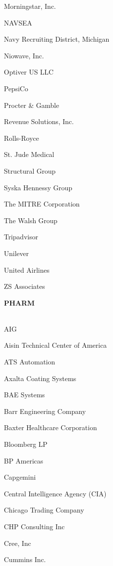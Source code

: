 \documentclass[twoside]{article}
\begin{document}
\begin{center}
\begin{multicols}{5}
\begin{FlushLeft}
\begin{compactitem}
\item Morningstar, Inc.
\item NAVSEA
\item Navy Recruiting District, Michigan
\item Niowave, Inc.
\item Optiver US LLC
\item PepsiCo
\item Procter \& Gamble
\item Revenue Solutions, Inc.
\item Rolls-Royce
\item St. Jude Medical
\item Structural Group
\item Syska Hennessy Group
\item The MITRE Corporation
\item The Walsh Group
\item Tripadvisor
\item Unilever
\item United Airlines
\item ZS Associates
\end{compactitem}
        \end{FlushLeft}
        \vspace{1em}
        {\fontsize{14}{16}\selectfont \bf PHARM}\\
        \vspace{-1em}
        ~\hrulefill~
        \vspace{-.9em}
        \begin{FlushLeft}
        \begin{compactitem}
        \item AIG
\item Aisin Technical Center of America
\item ATS Automation
\item Axalta Coating Systems
\item BAE Systems
\item Barr Engineering Company
\item Baxter Healthcare Corporation
\item Bloomberg LP
\item BP Americas
\item Capgemini
\item Central Intelligence Agency (CIA)
\item Chicago Trading Company
\item CHP Consulting Inc
\item Cree, Inc
\item Cummins Inc.

\end{compactitem}
\end{FlushLeft}
\end{multicols}
\end{center}
\end{document}
